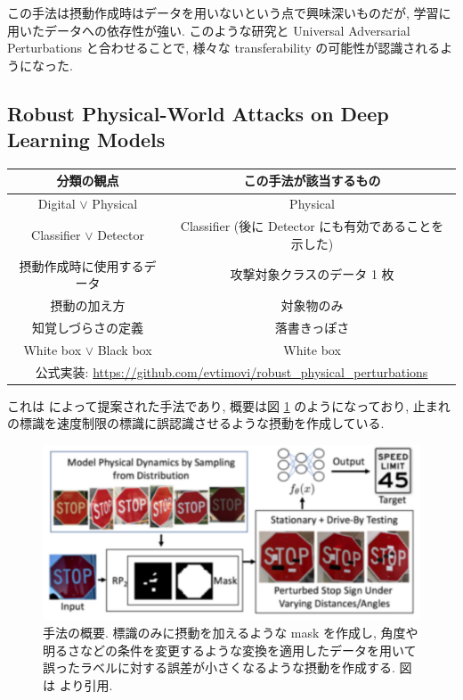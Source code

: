 この手法は摂動作成時はデータを用いないという点で興味深いものだが, 学習に用いたデータへの依存性が強い.
このような研究と Universal Adversarial Perturbations と合わせることで, 様々な transferability の可能性が認識されるようになった.



\subsection{Robust Physical-World Attacks on Deep Learning Models}
\label{subsec:robust-physical}
%
\begin{table}[htbp]
\begin{center}
\begin{tabular}{|c|c|}
\hline
分類の観点 & この手法が該当するもの \\
\hline
Digital $\lor$ Physical & Physical \\
Classifier $\lor$ Detector & Classifier (後に Detector にも有効であることを示した) \\
摂動作成時に使用するデータ & 攻撃対象クラスのデータ 1 枚 \\
摂動の加え方 & 対象物のみ \\
知覚しづらさの定義 & 落書きっぽさ \\
White box $\lor$ Black box & White box \\
\hline
\multicolumn{2}{|c|}{公式実装: \href{https://github.com/evtimovi/robust_physical_perturbations}{https://github.com/evtimovi/robust\_physical\_perturbations}} \\
\hline
\end{tabular}
\label{tb:robust-physical-summary}
\end{center}
\end{table}
%

これは \cite{eykholt2018robust} によって提案された手法であり, 概要は図 \ref{fig:robust-physical-summary} のようになっており, 止まれの標識を速度制限の標識に誤認識させるような摂動を作成している.
%
\begin{figure}[htbp]
\begin{center}
\includegraphics[width=12.0cm]{figures/robust-physical-summary.pdf}
\end{center}
\caption{
手法の概要.
標識のみに摂動を加えるような mask を作成し, 角度や明るさなどの条件を変更するような変換を適用したデータを用いて誤ったラベルに対する誤差が小さくなるような摂動を作成する.
図は \cite{eykholt2018robust} より引用.
}
\label{fig:robust-physical-summary}
\end{figure}
%


